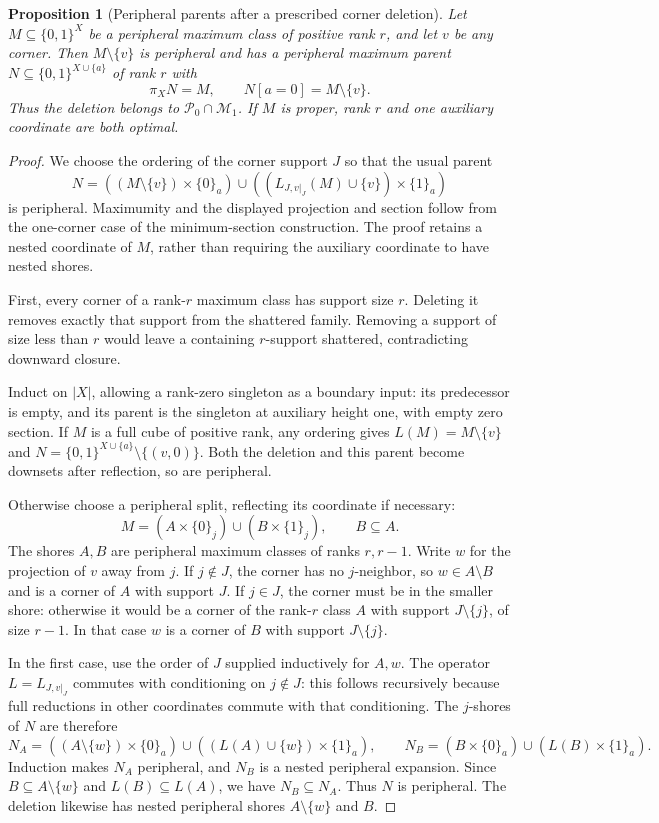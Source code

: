 \documentclass[11pt]{article}
\newtheorem{proposition}{Proposition}[section]
\theoremstyle{definition}
\newcommand{\bits}{\{0,1\}}
\begin{document}
\begin{proposition}[Peripheral parents after a prescribed corner deletion]
\label{prop:peripheral-corner-parent}
Let $M\subseteq\bits^X$ be a peripheral maximum class of positive rank $r$,
and let $v$ be any corner. Then $M\setminus\{v\}$ is peripheral and has
a peripheral maximum parent $N\subseteq\bits^{X\cup\{a\}}$ of rank $r$
with
\[
 \pi_XN=M,\qquad N[a=0]=M\setminus\{v\}.
\]
Thus the deletion belongs to $\mathcal P_0\cap\mathcal M_1$.
If $M$ is proper, rank $r$ and one auxiliary coordinate are both optimal.
\end{proposition}
\begin{proof}
We choose the ordering of the corner support $J$ so that the usual parent
\[
 N=((M\setminus\{v\})\times\{0\}_a)
       \cup((L_{J,v|_J}(M)\cup\{v\})\times\{1\}_a)
\]
is peripheral. Maximumity and the displayed projection and section follow
from the one-corner case of the minimum-section construction. The proof
retains a nested coordinate of $M$, rather than requiring the auxiliary
coordinate to have nested shores.

First, every corner of a rank-$r$ maximum class has support size $r$.
Deleting it removes exactly that support from the shattered family.
Removing a support of size less than $r$ would leave a containing
$r$-support shattered, contradicting downward closure.

Induct on $|X|$, allowing a rank-zero singleton as a boundary input:
its predecessor is empty, and its parent is the singleton at auxiliary
height one, with empty zero section. If $M$ is a full cube of positive
rank, any ordering gives $L(M)=M\setminus\{v\}$ and
$N=\bits^{X\cup\{a\}}\setminus\{(v,0)\}$.
Both the deletion and this parent become downsets after reflection,
so are peripheral.

Otherwise choose a peripheral split, reflecting its coordinate if necessary:
\[
 M=(A\times\{0\}_j)\cup(B\times\{1\}_j),\qquad B\subseteq A.
\]
The shores $A,B$ are peripheral maximum classes of ranks $r,r-1$.
Write $w$ for the projection of $v$ away from $j$.
If $j\notin J$, the corner has no $j$-neighbor, so $w\in A\setminus B$
and is a corner of $A$ with support $J$.
If $j\in J$, the corner must be in the smaller shore: otherwise it would
be a corner of the rank-$r$ class $A$ with support $J\setminus\{j\}$,
of size $r-1$. In that case $w$ is a corner of $B$ with support
$J\setminus\{j\}$.

In the first case, use the order of $J$ supplied inductively for $A,w$.
The operator $L=L_{J,v|_J}$ commutes with conditioning on $j\notin J$:
this follows recursively because full reductions in other coordinates
commute with that conditioning. The $j$-shores of $N$ are therefore
\[
 N_A=((A\setminus\{w\})\times\{0\}_a)
       \cup((L(A)\cup\{w\})\times\{1\}_a),\qquad
 N_B=(B\times\{0\}_a)\cup(L(B)\times\{1\}_a).
\]
Induction makes $N_A$ peripheral, and $N_B$ is a nested peripheral
expansion. Since $B\subseteq A\setminus\{w\}$ and
$L(B)\subseteq L(A)$, we have $N_B\subseteq N_A$.
Thus $N$ is peripheral. The deletion likewise has nested peripheral
shores $A\setminus\{w\}$ and $B$.


\end{proof}
\end{document}
